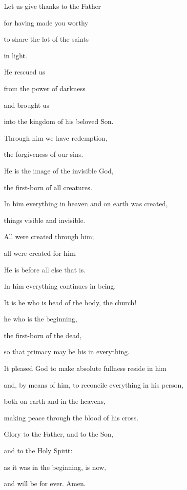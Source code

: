 \noindent Let us give thanks to the Father~\GreStar{}~\nopagebreak

for having made you worthy

\noindent to share the lot of the saints~\GreStar{}~\nopagebreak

in light.

\noindent He rescued us~\GreStar{}~\nopagebreak

from the power of darkness

\noindent and brought us~\GreStar{}~\nopagebreak

into the kingdom of his beloved Son.

\noindent Through him we have redemption,~\GreStar{}~\nopagebreak

the forgiveness of our sins.

\noindent He is the image of the invisible God,~\GreStar{}~\nopagebreak

the first-born of all creatures.

\noindent In him everything in heaven and on earth was created,~\GreStar{}~\nopagebreak

things visible and invisible.

\noindent All were created through him;~\GreStar{}~\nopagebreak

all were created for him.

\noindent He is before all else that is.~\GreStar{}~\nopagebreak

In him everything continues in being.

\noindent It is he who is head of the body, the church!~\GreStar{}~\nopagebreak

he who is the beginning,

\noindent the first-born of the dead,~\GreStar{}~\nopagebreak

so that primacy may be his in everything.

\noindent It pleased God to make absolute fullness reside in him~\GreStar{}~\nopagebreak

and, by means of him, to reconcile everything in his person,

\noindent both on earth and in the heavens,~\GreStar{}~\nopagebreak

making peace through the blood of his cross.

\noindent Glory to the Father, and to the Son,~\GreStar{}~\nopagebreak

and to the Holy Spirit:

\noindent as it was in the beginning, is now,~\GreStar{}~\nopagebreak

and will be for ever. Amen.
